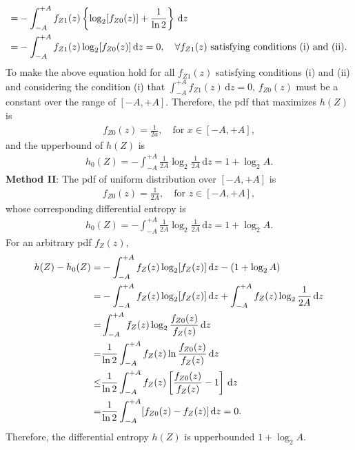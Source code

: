 \documentclass{assignment}
\begin{document}
\begin{sol}
\begin{itemize}
\begin{align}
            \notag=&-\int_{-A}^{+A}f_{Z1}(z)\left\{\log_2[f_{Z0}(z)]+\frac{1}{\ln 2}\right\}\,\mathrm{d}z\\
            =&-\int_{-A}^{+A}f_{Z1}(z)\log_2[f_{Z0}(z)]\,\mathrm{d}z=0,\quad\forall f_{Z1}(z)\text{ satisfying conditions (i) and (ii)}.
        \end{align}
        To make the above equation hold for all $f_{Z1}(z)$ satisfying conditions (i) and (ii) and considering the condition (i) that $\int_{-A}^{+A}f_{Z1}(z)\,\mathrm{d}z=0$, $f_{Z0}(z)$ must be a constant over the range of $[-A,+A]$. Therefore, the pdf that maximizes $h(Z)$ is
        \begin{align}
            f_{Z0}(z)=\frac{1}{2a},\quad\text{for }x\in[-A,+A],
        \end{align}
        and the upperbound of $h(Z)$ is
        \begin{align}
            h_0(Z)=-\int_{-A}^{+A}\frac{1}{2A}\log_2\frac{1}{2A}\,\mathrm{d}z=1+\log_2A.
        \end{align}
        \textbf{Method II}: The pdf of uniform distribution over $[-A,+A]$ is
        \begin{align}
            f_{Z0}(z)=\frac{1}{2A},\quad\text{for }z\in[-A,+A],
        \end{align}
        whose corresponding differential entropy is
        \begin{align}
            h_0(Z)=-\int_{-A}^{+A}\frac{1}{2A}\log_2\frac{1}{2A}\,\mathrm{d}z=1+\log_2A.
        \end{align}
        For an arbitrary pdf $f_Z(z)$,
        \begin{align}
            \label{P-4-Method-II-condition}
            \notag h(Z)-h_0(Z)=&-\int_{-A}^{+A}f_Z(z)\log_2[f_Z(z)]\,\mathrm{d}z-(1+\log_2A)\\
            \notag=&-\int_{-A}^{+A}f_Z(z)\log_2[f_Z(z)]\,\mathrm{d}z+\int_{-A}^{+A}f_Z(z)\log_2\frac{1}{2A}\,\mathrm{d}z\\
            \notag=&\int_{-A}^{+A}f_Z(z)\log_2\frac{f_{Z0}(z)}{f_Z(z)}\,\mathrm{d}z\\
            \notag=&\frac{1}{\ln 2}\int_{-A}^{+A}f_Z(z)\ln\frac{f_{Z0}(z)}{f_Z(z)}\,\mathrm{d}z\\
            \notag\leq&\frac{1}{\ln 2}\int_{-A}^{+A}f_Z(z)\left[\frac{f_{Z0}(z)}{f_Z(z)}-1\right]\,\mathrm{d}z\\
            =&\frac{1}{\ln 2}\int_{-A}^{+A}[f_{Z0}(z)-f_Z(z)]\,\mathrm{d}z=0.
        \end{align}
        Therefore, the differential entropy $h(Z)$ is upperbounded $1+\log_2A$.

\end{itemize}
\end{sol}
\end{document}
